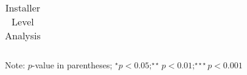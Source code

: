 \begin{table}[]
\begin{threeparttable}
\begin{tabular}{@{}lccc@{}}
\end{tabular}%
\begin{tablenotes}
\item Note: $p$-value in parentheses; $^\star p<0.05;^{\star\star} p<0.01;^{\star\star\star} p<0.001 $
\end{tablenotes}
\caption{Installer Level Analysis}
\label{reg_ind_all}
\end{threeparttable}
\end{table}